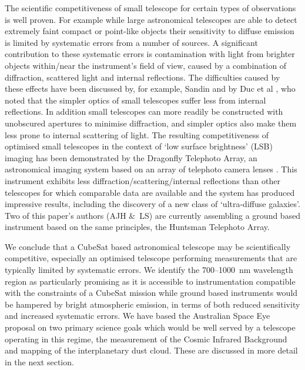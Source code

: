 \documentclass[]{iac}
\begin{document}
The scientific competitiveness of small telescope for certain types of observations is well proven. For example while
large astronomical telescopes are able to detect extremely faint compact or point-like objects their sensitivity to
diffuse emission is limited by systematic errors from a number of sources.  A significant contribution to these
systematic errors is contamination with light from brighter objects within/near the instrument's field of view, caused
by a combination of diffraction, scattered light and internal reflections. The difficulties caused by these effects have
been discussed by, for example, Sandin \cite{Sandin2014,Sandin2015} and by Duc et al \cite{Duc2014}, who noted that the
simpler optics of small telescopes suffer less from internal reflections. In addition small telescopes can more readily
be constructed with unobscured apertures to minimise diffraction, and simpler optics also make them less prone to
internal scattering of light. The resulting competitiveness of optimised small telescopes in the context of `low surface
brightness' (LSB) imaging has been demonstrated by the Dragonfly Telephoto Array, an astronomical imaging system based
on an array of telephoto camera lenses \cite{Abraham2014}.  This instrument exhibits less
diffraction/scattering/internal reflections than other telescopes for which comparable data are available
\cite{Abraham2014,Sandin2014} and the system has produced impressive results, including the discovery of a new class of
`ultra-diffuse galaxies'\cite{VanDokkum2015}.  Two of this paper's authors (AJH \&\ LS) are currently assembling a
ground based instrument based on the same principles, the Huntsman Telephoto Array\cite{Horton2016}.

We conclude that a CubeSat based astronomical telescope may be scientifically competitive, especially an optimised
telescope performing measurements that are typically limited by systematic errors. We identify the
700--\SI{1000}{\nano\metre} wavelength region as particularly promising as it is accessible to instrumentation
compatible with the constraints of a CubeSat mission while ground based instruments would be hampered by bright
atmospheric emission, in terms of both reduced sensitivity and increased systematic errors. We have based the
Australian Space Eye proposal on two primary science goals which would be well served by a telescope operating in this
regime, the measurement of the Cosmic Infrared Background and mapping of the interplanetary dust cloud. These are
discussed in more detail in the next section.
\end{document}
